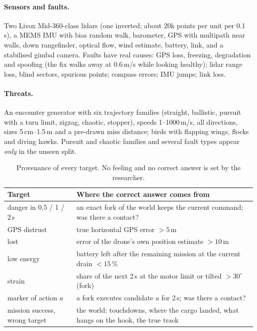 \documentclass[10pt]{article}
\begin{document}
\paragraph{Sensors and faults.} Two Livox Mid-360-class lidars (one inverted; about 20k points per unit per 0.1\,s), a MEMS IMU
with bias random walk, barometer, GPS with multipath near walls, down rangefinder, optical flow, wind estimate, battery, link, and a
stabilised gimbal camera. Faults have real causes: GPS loss, freezing, degradation and spoofing (the fix walks away at 0.6\,m/s while
looking healthy); lidar range loss, blind sectors, spurious points; compass errors; IMU jumps; link loss.
\paragraph{Threats.} An encounter generator with six trajectory families (straight, ballistic, pursuit with a turn limit, zigzag,
chaotic, stopper), speeds 1--1000\,m/s, all directions, sizes 5\,cm--1.5\,m and a pre-drawn miss distance; birds with flapping wings,
flocks and diving hawks. Pursuit and chaotic families and several fault types appear \emph{only} in the unseen split.

\begin{table}[t]
\centering\small
\caption{Provenance of every target. No feeling and no correct answer is set by the researcher.}
\label{tab:prov}
\begin{tabularx}{\linewidth}{@{}lX@{}}
\toprule
Target & Where the correct answer comes from \\
\midrule
danger in 0.5 / 1 / 2\,s & an exact fork of the world keeps the current command; was there a contact? \\
GPS distrust & true horizontal GPS error $>5$\,m \\
lost & error of the drone's own position estimate $>10$\,m \\
low energy & battery left after the remaining mission at the current drain $<15$\,\% \\
strain & share of the next 2\,s at the motor limit or tilted $>30^\circ$ (fork) \\
marker of action $a$ & a fork executes candidate $a$ for 2\,s; was there a contact? \\
mission success, wrong target & the world: touchdowns, where the cargo landed, what hangs on the hook, the true track \\
\bottomrule
\end{tabularx}
\end{table}
\end{document}
